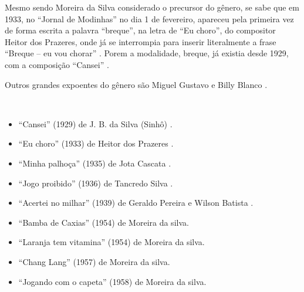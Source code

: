 Mesmo sendo Moreira da Silva considerado o precursor do gênero, 
se sabe que em 1933, no ``Jornal de Modinhas'' no dia 1 de fevereiro, 
apareceu pela primeira vez de forma escrita a palavra ``breque'', na letra de ``Eu choro'', 
do compositor Heitor dos Prazeres, onde já se interrompia para inserir literalmente 
a frase ``Breque -- eu vou chorar'' \cite[pp. 291]{dourado2004dicionario} \cite{rizzi2016musica}.
Porem a modalidade, breque, já existia desde 1929, com a composição ``Cansei'' \cite{rizzi2016musica}.

Outros grandes expoentes do gênero são Miguel Gustavo e Billy Blanco \cite[pp. 291]{dourado2004dicionario}.

\begin{example} ~

\begin{itemize}
\item ``Cansei'' (1929) de J. B. da Silva (Sinhô) \cite{rizzi2016musica} \cite{aguiar2013reis}.
\item ``Eu choro'' (1933) de Heitor dos Prazeres  \cite[pp. 291]{dourado2004dicionario}.
\item ``Minha palhoça'' (1935) de Jota Cascata \cite{aguiar2013reis}.
\item ``Jogo proibido'' (1936) de Tancredo Silva \cite{rizzi2016musica}.
\item ``Acertei no milhar'' (1939) de Geraldo Pereira e Wilson Batista \cite[pp. 129]{perna2002samba}.
\item ``Bamba de Caxias'' (1954) de Moreira da silva\cite{subgenerosdosamba2}.
\item ``Laranja tem vitamina'' (1954)  de Moreira da silva\cite{subgenerosdosamba2}.
\item ``Chang Lang'' (1957) de Moreira da silva\cite{subgenerosdosamba2}.
\item ``Jogando com o capeta'' (1958)  de Moreira da silva\cite{subgenerosdosamba2}.
\end{itemize}
\end{example}



